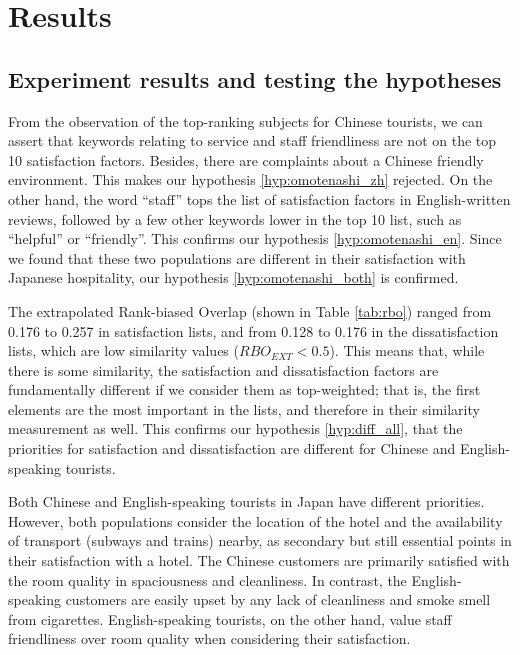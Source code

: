 \documentclass[smallextended,natbib]{svjour3}       %
\begin{document}
\section{Results}\label{results}

  \subsection{Experiment results and testing the hypotheses}

    From the observation of the top-ranking subjects for Chinese tourists, we can assert that keywords relating to service and staff friendliness are not on the top 10 satisfaction factors. Besides, there are complaints about a Chinese friendly environment. This makes our hypothesis \ref{hyp:omotenashi_zh} rejected. On the other hand, the word ``staff'' tops the list of satisfaction factors in English-written reviews, followed by a few other keywords lower in the top 10 list, such as ``helpful'' or ``friendly''. This confirms our hypothesis \ref{hyp:omotenashi_en}. Since we found that these two populations are different in their satisfaction with Japanese hospitality, our hypothesis \ref{hyp:omotenashi_both} is confirmed.

    The extrapolated Rank-biased Overlap (shown in Table \ref{tab:rbo}) ranged from 0.176 to 0.257 in satisfaction lists, and from 0.128 to 0.176 in the dissatisfaction lists, which are low similarity values (\(RBO_{EXT} < 0.5\)). This means that, while there is some similarity, the satisfaction and dissatisfaction factors are fundamentally different if we consider them as top-weighted; that is, the first elements are the most important in the lists, and therefore in their similarity measurement as well. This confirms our hypothesis \ref{hyp:diff_all}, that the priorities for satisfaction and dissatisfaction are different for Chinese and English-speaking tourists. 

    Both Chinese and English-speaking tourists in Japan have different priorities. However, both populations consider the location of the hotel and the availability of transport (subways and trains) nearby, as secondary but still essential points in their satisfaction with a hotel. The Chinese customers are primarily satisfied with the room quality in spaciousness and cleanliness. In contrast, the English-speaking customers are easily upset by any lack of cleanliness and smoke smell from cigarettes. English-speaking tourists, on the other hand, value staff friendliness over room quality when considering their satisfaction. 
\end{document}
